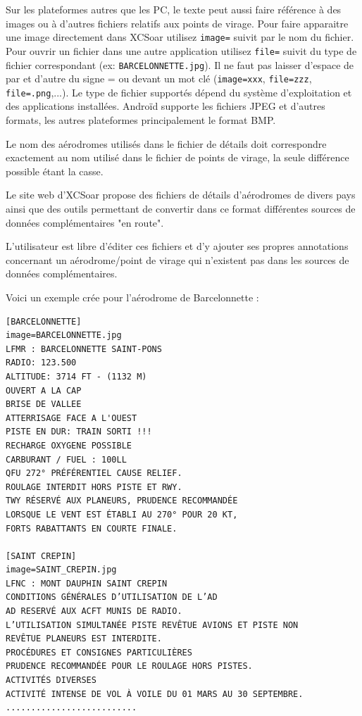 Sur les plateformes autres que les PC, le texte peut aussi faire référence à des images ou à d'autres fichiers relatifs aux points de virage. Pour faire apparaitre une image directement dans XCSoar utilisez \verb|image=| suivit par le nom du fichier. Pour ouvrir un fichier dans une autre application utilisez \verb|file=| suivit du type de fichier correspondant (ex: \verb|BARCELONNETTE.jpg|). Il ne faut pas laisser d'espace de par et d'autre du signe = ou devant un mot clé (\verb|image=xxx|, 
 \verb|file=zzz|, \verb|file=.png|,...). Le type de fichier supportés dépend du système d'exploitation et des applications installées. Androïd supporte les fichiers JPEG et d'autres formats, les autres plateformes principalement le format BMP.

Le nom des aérodromes utilisés dans le fichier de détails doit correspondre exactement au nom utilisé dans le fichier de points de virage, la seule différence possible étant la casse.

Le site web d'XCSoar propose des fichiers de détails d'aérodromes de divers pays ainsi que des outils permettant de convertir dans ce format différentes sources de données complémentaires "en route".

L'utilisateur est libre d'éditer ces fichiers et d'y ajouter ses propres annotations concernant un aérodrome/point de virage qui n'existent pas dans les sources de données complémentaires.

Voici un exemple crée pour l'aérodrome de Barcelonnette :
\begin{verbatim}
[BARCELONNETTE]
image=BARCELONNETTE.jpg
LFMR : BARCELONNETTE SAINT-PONS
RADIO: 123.500
ALTITUDE: 3714 FT - (1132 M)
OUVERT A LA CAP
BRISE DE VALLEE
ATTERRISAGE FACE A L'OUEST 
PISTE EN DUR: TRAIN SORTI !!!
RECHARGE OXYGENE POSSIBLE
CARBURANT / FUEL : 100LL
QFU 272° PRÉFÉRENTIEL CAUSE RELIEF.
ROULAGE INTERDIT HORS PISTE ET RWY.
TWY RÉSERVÉ AUX PLANEURS, PRUDENCE RECOMMANDÉE
LORSQUE LE VENT EST ÉTABLI AU 270° POUR 20 KT,
FORTS RABATTANTS EN COURTE FINALE.

[SAINT CREPIN]
image=SAINT_CREPIN.jpg
LFNC : MONT DAUPHIN SAINT CREPIN
CONDITIONS GÉNÉRALES D’UTILISATION DE L’AD
AD RESERVÉ AUX ACFT MUNIS DE RADIO.
L’UTILISATION SIMULTANÉE PISTE REVÊTUE AVIONS ET PISTE NON
REVÊTUE PLANEURS EST INTERDITE.
PROCÉDURES ET CONSIGNES PARTICULIÈRES
PRUDENCE RECOMMANDÉE POUR LE ROULAGE HORS PISTES.
ACTIVITÉS DIVERSES
ACTIVITÉ INTENSE DE VOL À VOILE DU 01 MARS AU 30 SEPTEMBRE.
..........................

\end{verbatim}

